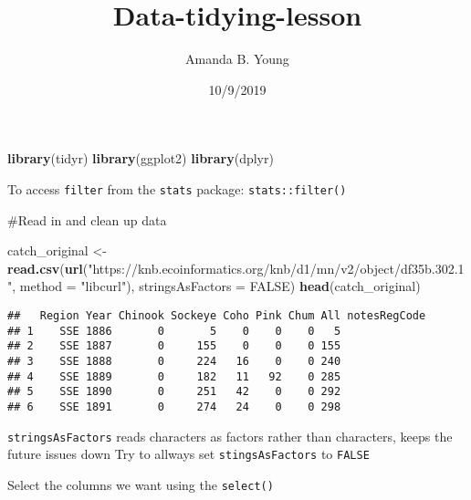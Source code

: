 \documentclass[]{article}
\title{Data-tidying-lesson}
\author{Amanda B. Young}
\date{10/9/2019}
\newenvironment{Shaded}{\begin{snugshade}}{\end{snugshade}}
\newcommand{\CommentTok}[1]{\textcolor[rgb]{0.56,0.35,0.01}{\textit{#1}}}
\newcommand{\DataTypeTok}[1]{\textcolor[rgb]{0.13,0.29,0.53}{#1}}
\newcommand{\KeywordTok}[1]{\textcolor[rgb]{0.13,0.29,0.53}{\textbf{#1}}}
\newcommand{\NormalTok}[1]{#1}
\newcommand{\OperatorTok}[1]{\textcolor[rgb]{0.81,0.36,0.00}{\textbf{#1}}}
\newcommand{\OtherTok}[1]{\textcolor[rgb]{0.56,0.35,0.01}{#1}}
\newcommand{\StringTok}[1]{\textcolor[rgb]{0.31,0.60,0.02}{#1}}
\begin{document}
\maketitle

\begin{Shaded}
\begin{Highlighting}[]
\KeywordTok{library}\NormalTok{(tidyr)}
\KeywordTok{library}\NormalTok{(ggplot2)}
\KeywordTok{library}\NormalTok{(dplyr)}
\end{Highlighting}
\end{Shaded}

To access \texttt{filter} from the \texttt{stats} package:
\texttt{stats::filter()}

\#Read in and clean up data

\begin{Shaded}
\begin{Highlighting}[]
\NormalTok{catch_original <-}\StringTok{ }\KeywordTok{read.csv}\NormalTok{(}\KeywordTok{url}\NormalTok{(}\StringTok{"https://knb.ecoinformatics.org/knb/d1/mn/v2/object/df35b.302.1"}\NormalTok{, }\DataTypeTok{method =} \StringTok{"libcurl"}\NormalTok{),}
                    \DataTypeTok{stringsAsFactors =} \OtherTok{FALSE}\NormalTok{)}
\KeywordTok{head}\NormalTok{(catch_original)}
\end{Highlighting}
\end{Shaded}

\begin{verbatim}
##   Region Year Chinook Sockeye Coho Pink Chum All notesRegCode
## 1    SSE 1886       0       5    0    0    0   5             
## 2    SSE 1887       0     155    0    0    0 155             
## 3    SSE 1888       0     224   16    0    0 240             
## 4    SSE 1889       0     182   11   92    0 285             
## 5    SSE 1890       0     251   42    0    0 292             
## 6    SSE 1891       0     274   24    0    0 298
\end{verbatim}

\texttt{stringsAsFactors} reads characters as factors rather than
characters, keeps the future issues down Try to allways set
\texttt{stingsAsFactors} to \texttt{FALSE}

Select the columns we want using the \texttt{select()}

\begin{Shaded}
\end{Shaded}
\end{document}
